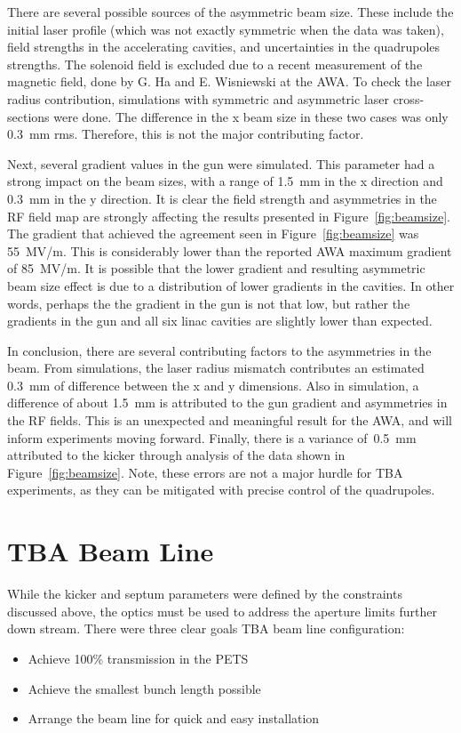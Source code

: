 \documentclass[aps,prab,preprint,groupedaddress,linenumbers]{revtex4-2}
\begin{document}
There are several possible sources of the asymmetric beam size. 
These include the initial laser profile (which was not exactly symmetric
when the data was taken), field strengths in the accelerating cavities, 
and uncertainties in the quadrupoles strengths.
The solenoid field is excluded due to a recent measurement of the magnetic field, 
done by G. Ha and E. Wisniewski at the AWA. 
To check the laser radius contribution, simulations with symmetric and asymmetric laser cross-sections were done.
The difference in the x beam size in these two cases was only \SI{0.3}{mm} rms. 
Therefore, this is not the major contributing factor.

Next, several gradient values in the gun were simulated. 
This parameter had a strong impact on the beam sizes, with a range of \SI{1.5}{mm} 
in the x direction and \SI{0.3}{mm} in the y direction.
It is clear the field strength and asymmetries in the RF field map 
are strongly affecting the results presented in Figure~\ref{fig:beamsize}.
The gradient that achieved the agreement seen in Figure~\ref{fig:beamsize} was \SI{55}{MV/m}.
This is considerably lower than the reported AWA maximum gradient of \SI{85}{MV/m}.
It is possible that the lower gradient and resulting asymmetric beam size effect is 
due to a distribution of lower gradients in the cavities. 
In other words, perhaps the the gradient in the gun is not that low, but rather
the gradients in the gun and all six linac cavities are slightly lower than expected.

In conclusion, there are several contributing factors to the asymmetries in the beam.
From simulations, the laser radius mismatch contributes an estimated \SI{0.3}{mm} of difference 
between the x and y dimensions. Also in simulation, a difference of about \SI{1.5}{mm} 
is attributed to the gun gradient and asymmetries in the RF fields. 
This is an unexpected and meaningful result for the AWA, and will inform experiments moving forward.
Finally, there is a variance of~\SI{0.5}{mm} attributed to the kicker through analysis of the 
data shown in Figure~\ref{fig:beamsize}.
Note, these errors are not a major hurdle for TBA experiments, as they can
be mitigated with precise control of the quadrupoles.


\section{TBA Beam Line}

While the kicker and septum parameters were defined by the constraints discussed above, 
the optics must be used to address the aperture limits further down stream.
There were three clear goals TBA beam line configuration: 
\begin{itemize}
	\item Achieve 100\% transmission in the PETS
	\item Achieve the smallest bunch length possible
	\item Arrange the beam line for quick and easy installation
\end{itemize}
\end{document}
